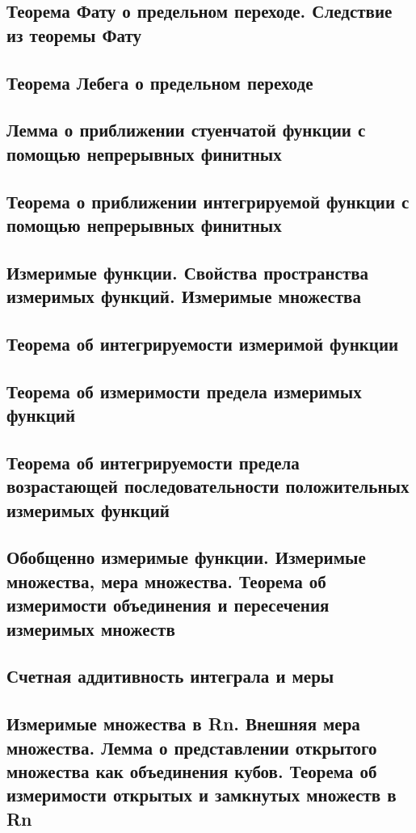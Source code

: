 \documentclass[a4paper]{article}
\theoremstyle{definition}
\theoremstyle{remark}
\begin{document}
    \subsection{ Теорема Фату о предельном переходе. Следствие из теоремы Фату}
    \subsection{ Теорема Лебега о предельном переходе}
    \subsection{ Лемма о приближении стуенчатой функции с помощью непрерывных финитных}
    \subsection{ Теорема о приближении интегрируемой функции с помощью непрерывных финитных}
    \subsection{ Измеримые функции. Свойства пространства измеримых функций. Измеримые множества}
    \subsection{ Теорема об интегрируемости измеримой функции}
    \subsection{ Теорема об измеримости предела измеримых функций}
    \subsection{ Теорема об интегрируемости предела возрастающей
    последовательности положительных измеримых функций}
    \subsection{ Обобщенно измеримые функции. Измеримые множества, мера множества. Теорема об измеримости объединения и пересечения измеримых множеств}
    \subsection{ Счетная аддитивность интеграла и меры}
    \subsection{ Измеримые множества в Rn. Внешняя мера множества. Лемма о представлении открытого множества как объединения кубов. Теорема об измеримости открытых и замкнутых множеств в Rn}
\end{document}
